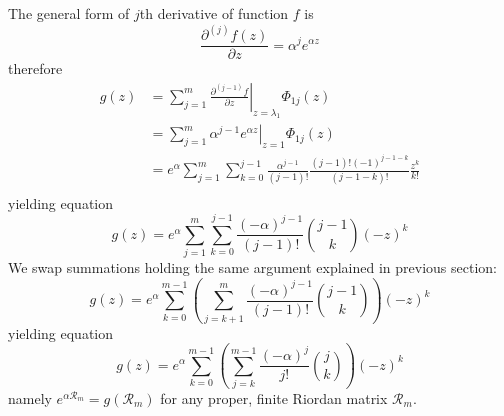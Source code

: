 The general form of $j$th derivative of function $f$ is 
$$\frac{\partial^{(j)}{f}(z)}{\partial{z}} = \alpha^{j} e^{\alpha z}$$ 
therefore
\begin{displaymath}
\begin{split}
  g(z) &= \sum_{j=1}^{m}{ \left. \frac{\partial^{(j-1)}{f}}{\partial{z}} \right|_{z=\lambda_{1}}\Phi_{1j}(z)} \\
       &= \sum_{j=1}^{m}{ \left. \alpha^{j-1} e^{\alpha z} \right|_{z=1}\Phi_{1j}(z)} \\
       &= e^{\alpha}\sum_{j=1}^{m}{\sum_{k=0}^{j-1}{\frac{\alpha^{j-1}}{(j-1)!}  \frac{(j-1)!(-1)^{j-1-k}}{(j-1-k)!}\frac{z^{k}}{k!}}}\\
\end{split}
\end{displaymath}
yielding equation
\begin{equation}
  g(z) = e^{\alpha}\sum_{j=1}^{m}{\sum_{k=0}^{j-1}{\frac{(-\alpha)^{j-1}}{(j-1)!}{{j-1}\choose{k}}(-z)^{k}}} 
\end{equation}
We swap summations holding the same argument explained in previous section:
\begin{displaymath}
  g(z) = e^{\alpha}\sum_{k=0}^{m-1}{\left(\sum_{j=k+1}^{m}{\frac{(-\alpha)^{j-1}}{(j-1)!}{{j-1}\choose{k}}}\right)(-z)^{k}}
\end{displaymath}
yielding equation
\begin{equation}
  g(z) = e^{\alpha}\sum_{k=0}^{m-1}{\left(\sum_{j=k}^{m-1}{\frac{(-\alpha)^{j}}{j!}{{j}\choose{k}}}\right)(-z)^{k}}
\end{equation}
namely $e^{\alpha\mathcal{R}_{m}}=g(\mathcal{R}_{m})$ for any proper, 
finite Riordan matrix $\mathcal{R}_{m}$.

